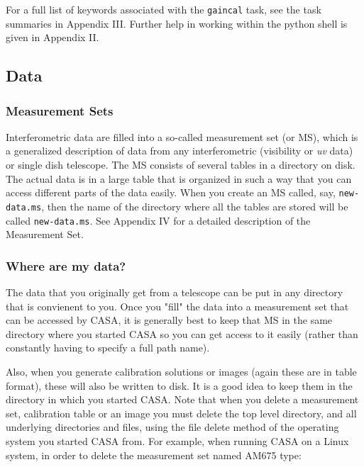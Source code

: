 For a full list of keywords associated with the {\tt gaincal} task,
see the task summaries in Appendix III.  Further help in working within
the python shell is given in Appendix II.


\subsection{Data}
\label{subsection:data}

\subsubsection{Measurement Sets}
\label{subsubsection:MSs}

Interferometric data are filled into a so-called measurement set (or
MS), which is a generalized description of data from any
interferometric (visibility or {\it uv} data) or single dish telescope.
The MS consists of several tables in a directory on disk.  The actual
data is in a large table that is organized in such a way that you can
access different parts of the data easily.  When you create an MS
called, say, {\tt new-data.ms}, then the name of the directory where all
the tables are stored will be called {\tt new-data.ms}.  See Appendix IV
for a detailed description of the Measurement Set.

\subsubsection{Where are my data?}
\label{subsubsection:where.data}

The data that you originally get from a telescope can be put in any
directory that is convienent to you.  Once you "fill" the data into a
measurement set that can be accessed by CASA, it is generally best to
keep that MS in the same directory where you started CASA so you can
get access to it easily (rather than constantly having to specify a
full path name).

Also, when you generate calibration solutions or images (again these
are in table format), these will also be written to disk.  It is a
good idea to keep them in the directory in which you started CASA.
Note that when you delete a measurement set, calibration table or an
image you must delete the top level directory, and all underlying
directories and files, using the file delete method of the operating
system you started CASA from.  For example, when running CASA on a
Linux system, in order to delete the measurement set named AM675 type:

